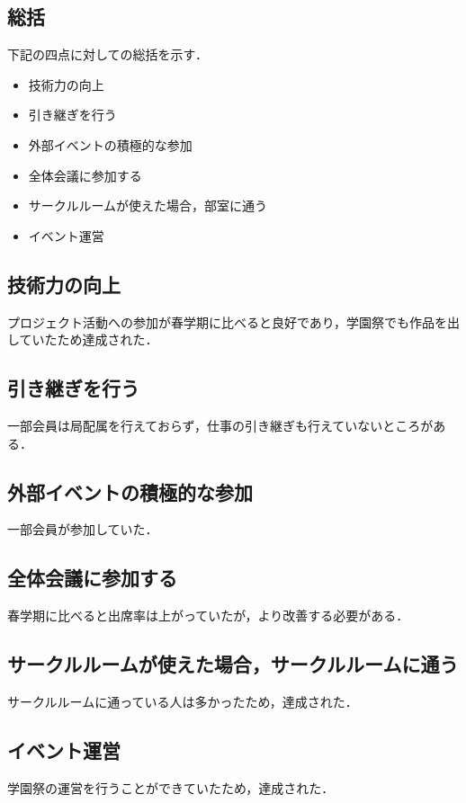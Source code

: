 \subsection*{\secondGrade{}総括}


下記の四点に対しての総括を示す．
\begin{itemize}
    \item 技術力の向上
    \item 引き継ぎを行う
    \item 外部イベントの積極的な参加
    \item 全体会議に参加する
    \item サークルルームが使えた場合，部室に通う
    \item イベント運営
\end{itemize}

\subsection*{技術力の向上}
プロジェクト活動への参加が春学期に比べると良好であり，学園祭でも作品を出していたため達成された．
\subsection*{引き継ぎを行う}
一部会員は局配属を行えておらず，仕事の引き継ぎも行えていないところがある．
\subsection*{外部イベントの積極的な参加}
一部会員が参加していた．
\subsection*{全体会議に参加する}
春学期に比べると出席率は上がっていたが，より改善する必要がある．
\subsection*{サークルルームが使えた場合，サークルルームに通う}
サークルルームに通っている人は多かったため，達成された．
\subsection*{イベント運営}
学園祭の運営を行うことができていたため，達成された．
